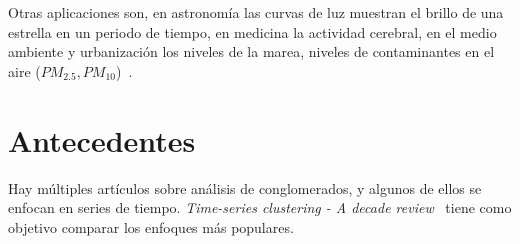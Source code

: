 \documentclass[twocolumn,10pt]{asme2ej}
\begin{document}
Otras aplicaciones son, en astronom\'ia las curvas de luz muestran el brillo de una estrella en un periodo de tiempo, en medicina la actividad cerebral, en el medio ambiente y urbanizaci\'on los niveles de la marea, niveles de contaminantes en el aire ($PM_{2.5}, PM_{10}$)~\cite{TIME_SERIES_CLUSTERING}.\\


\section*{Antecedentes} %
\label{sec:antecedentes}
Hay m\'ultiples art\'iculos sobre an\'alisis de conglomerados, y algunos de ellos se enfocan en series de tiempo. \textit{Time-series clustering - A decade review}~\cite{TIME_SERIES_CLUSTERING} tiene como objetivo comparar los enfoques m\'as populares.~\cite{TIME_SERIES_CLUSTERING}\\


\end{document}
